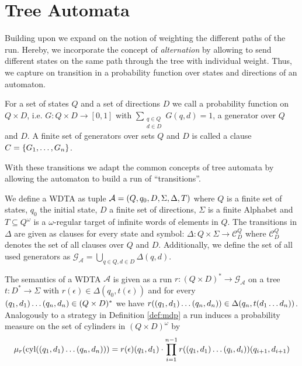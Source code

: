 \section{Tree Automata}
Building upon \cite{RandAutoInfTrees} we expand on the notion of weighting
the different paths of the run. Hereby, we incorporate the concept of
\emph{alternation} by allowing to send different states on the same path
through the tree with individual weight. Thus, we capture on transition in a
probability function over states and directions of an automaton.
\begin{definition}[Generator]
  For a set of states $Q$ and a set of directions $D$ we call a probability
  function on $Q\times D$, i.e. $G: Q\times D\rightarrow [0,1]$ with
  $\sum\limits_{\substack{q\in Q\\ d\in D}}G(q,d) = 1$, a generator over $Q$
  and $D$. A finite set of generators over sets $Q$ and $D$ is called a clause
  $C = \left\{G_{1},\dots,G_{n}\right\}$.
\end{definition}
With these transitions we adapt the common concepts of tree automata by
allowing the automaton to build a run of \enquote{transitions}.
\begin{definition}
  We define a \acl{WDTA} as tuple
  $\mathcal{A} = \left(Q, q_{0}, D, \Sigma, \Delta, T\right)$ where $Q$ is a finite
  set of states, $q_{0}$ the initial state, $D$ a finite set of directions,
  $\Sigma$ is a finite Alphabet and $T\subseteq Q^{\omega}$ is a
  $\omega$-regular target of infinite words of elements in $Q$. The transitions
  in $\Delta$ are given as clauses for every state and symbol:
  $\Delta:Q\times\Sigma\rightarrow\mathcal{C}^{Q}_{D}$
  where $\mathcal{C}^{Q}_{D}$ denotes the set of all clauses over $Q$ and $D$.
  Additionally, we define the set of all used generators as
  $\mathcal{G}_{\mathcal{A}} = \bigcup\limits_{q\in Q,d\in D}\Delta(q,d)$.
\end{definition}
The semantics of a \ac{WDTA} $\mathcal{A}$ is given as a run
$r:(Q\times D)^{*}\rightarrow \mathcal{G}_{\mathcal{A}}$ on a tree
$t:D^{*}\rightarrow\Sigma$ with $r(\epsilon)\in \Delta(q_0, t(\epsilon))$ and
for every $\left(q_{1},d_{1}\right)\dots\left(q_{n},d_{n}\right)\in(Q\times D)^{*}$ we
have $r(\left(q_{1},d_{1}\right)\dots\left(q_{n},d_{n}\right))\in
  \Delta(q_{n},t(d_{1}\dots d_{n}))$. Analogously to a strategy in Definition
\ref{def:mdp} a run induces a probability measure on the set of cylinders
in $(Q\times D)^{\omega}$ by
\begin{equation}
  \mu_{r}(\operatorname{cyl}(\left(q_{1},d_{1}\right)\dots\left(q_{n},d_{n}\right)))
    = r(\epsilon)(q_{1},d_{1})\cdot\prod\limits_{i = 1}^{n - 1}
    r(\left(q_{1},d_{1}\right)\dots\left(q_{i},d_{i}\right))(q_{i+1},d_{i+1})
\end{equation}
